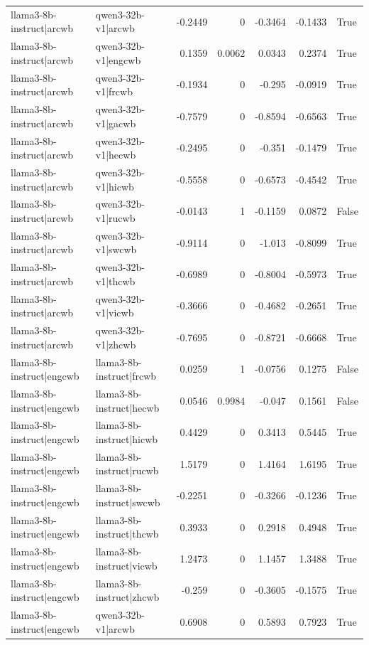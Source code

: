 \begin{table}
\begin{tabular}{l l r r r r l}
llama3-8b-instruct|arcwb & qwen3-32b-v1|arcwb & -0.2449 & 0 & -0.3464 & -0.1433 & True \\
llama3-8b-instruct|arcwb & qwen3-32b-v1|engcwb & 0.1359 & 0.0062 & 0.0343 & 0.2374 & True \\
llama3-8b-instruct|arcwb & qwen3-32b-v1|frcwb & -0.1934 & 0 & -0.295 & -0.0919 & True \\
llama3-8b-instruct|arcwb & qwen3-32b-v1|gacwb & -0.7579 & 0 & -0.8594 & -0.6563 & True \\
llama3-8b-instruct|arcwb & qwen3-32b-v1|hecwb & -0.2495 & 0 & -0.351 & -0.1479 & True \\
llama3-8b-instruct|arcwb & qwen3-32b-v1|hicwb & -0.5558 & 0 & -0.6573 & -0.4542 & True \\
llama3-8b-instruct|arcwb & qwen3-32b-v1|rucwb & -0.0143 & 1 & -0.1159 & 0.0872 & False \\
llama3-8b-instruct|arcwb & qwen3-32b-v1|swcwb & -0.9114 & 0 & -1.013 & -0.8099 & True \\
llama3-8b-instruct|arcwb & qwen3-32b-v1|thcwb & -0.6989 & 0 & -0.8004 & -0.5973 & True \\
llama3-8b-instruct|arcwb & qwen3-32b-v1|vicwb & -0.3666 & 0 & -0.4682 & -0.2651 & True \\
llama3-8b-instruct|arcwb & qwen3-32b-v1|zhcwb & -0.7695 & 0 & -0.8721 & -0.6668 & True \\
llama3-8b-instruct|engcwb & llama3-8b-instruct|frcwb & 0.0259 & 1 & -0.0756 & 0.1275 & False \\
llama3-8b-instruct|engcwb & llama3-8b-instruct|hecwb & 0.0546 & 0.9984 & -0.047 & 0.1561 & False \\
llama3-8b-instruct|engcwb & llama3-8b-instruct|hicwb & 0.4429 & 0 & 0.3413 & 0.5445 & True \\
llama3-8b-instruct|engcwb & llama3-8b-instruct|rucwb & 1.5179 & 0 & 1.4164 & 1.6195 & True \\
llama3-8b-instruct|engcwb & llama3-8b-instruct|swcwb & -0.2251 & 0 & -0.3266 & -0.1236 & True \\
llama3-8b-instruct|engcwb & llama3-8b-instruct|thcwb & 0.3933 & 0 & 0.2918 & 0.4948 & True \\
llama3-8b-instruct|engcwb & llama3-8b-instruct|vicwb & 1.2473 & 0 & 1.1457 & 1.3488 & True \\
llama3-8b-instruct|engcwb & llama3-8b-instruct|zhcwb & -0.259 & 0 & -0.3605 & -0.1575 & True \\
llama3-8b-instruct|engcwb & qwen3-32b-v1|arcwb & 0.6908 & 0 & 0.5893 & 0.7923 & True \\

\end{tabular}
\end{table}
